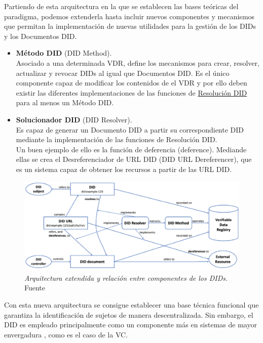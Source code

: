 \documentclass[../main.tex]{subfiles}
\begin{document}
Partiendo de esta arquitectura en la que se establecen las bases teóricas del paradigma, podemos extenderla hasta incluir nuevos componentes y mecanismos que permitan la implementación de nuevas utilidades para la gestión de los \acrshort{DID}s y los Documentos DID. 

\begin{itemize}
    \item \textbf{Método DID} (DID Method). \\
    Asociado a una determinada \acrshort{VDR}, define los mecanismos para crear, resolver, actualizar y revocar \acrshort{DID}s al igual que Documentos DID. Es el único componente capaz de modificar los contenidos de el \acrshort{VDR} y por ello deben existir las diferentes implementaciones de las funciones de \underline{Resolución DID} para al menos un Método DID.
    
    \item \textbf{Solucionador DID} (DID Resolver). \\
    Es capaz de generar un Documento DID a partir su correspondiente \acrshort{DID}  mediante la implementación de las funciones de Resolución DID.
    \\
    Un buen ejemplo de ello es la función de deferencia (deference). Mediande ellas se crea el Desreferenciador de URL DID (DID URL Dereferencer), que es un sistema capaz de obtener los recursos a partir de las URL DID.
    \\
\end{itemize}

\begin{figure}[htbp]
    \centering
    \includegraphics[width=0.85\linewidth]{images/DID_ArquitecturaCompleta.png}
    \caption{\textit{Arquitectura extendida y relación entre componentes de los \acrshort{DID}s.} Fuente \cite{ChallengesSSI}}
    \label{fig:extendedDID}
\end{figure}

Con esta nueva arquitectura se consigue establecer una base técnica funcional que garantiza la identificación de sujetos de manera descentralizada. Sin embargo, el \acrfull{DID} es empleado principalmente como un componente más en sistemas de mayor envergadura , como es el caso de la \acrfull{VC}.
\end{document}
